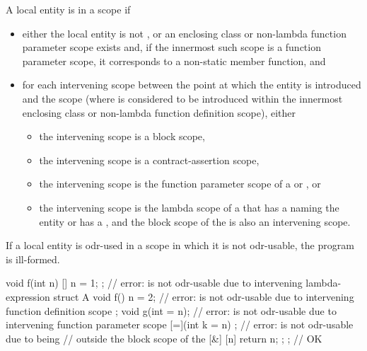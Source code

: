 \pnum
A local entity
is  in a scope if
\begin{itemize}
\item either the local entity is not , or
an enclosing class or non-lambda function parameter scope exists and,
if the innermost such scope is a function parameter scope,
it corresponds to a non-static member function, and
\item
for each intervening scope
between the point at which the entity is introduced and the scope
(where  is considered to be introduced
within the innermost enclosing class or non-lambda function definition scope),
either
\begin{itemize}
\item the intervening scope is a block scope,
\item the intervening scope is a contract-assertion scope,
\item the intervening scope is the function parameter scope of
a  or , or
\item the intervening scope is the lambda scope of
a 
that has a 
naming the entity or has a , and
the block scope of the 
is also an intervening scope.
\end{itemize}
\end{itemize}

If a local entity is odr-used
in a scope in which it is not odr-usable,
the program is ill-formed.
\begin{example}
\begin{codeblock}
void f(int n) {
  [] { n = 1; };                // error:  is not odr-usable due to intervening lambda-expression
  struct A {
    void f() { n = 2; }         // error:  is not odr-usable due to intervening function definition scope
  };
  void g(int = n);              // error:  is not odr-usable due to intervening function parameter scope
  [=](int k = n) {};            // error:  is not odr-usable due to being
                                // outside the block scope of the 
  [&] { [n]{ return n; }; };    // OK
}
\end{codeblock}
\end{example}


